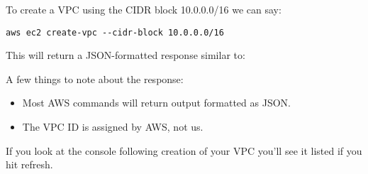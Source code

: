 To create a VPC using the CIDR block 10.0.0.0/16 we can say:

\begin{verbatim}
aws ec2 create-vpc --cidr-block 10.0.0.0/16
\end{verbatim}

This will return a JSON-formatted response similar to:

\begin{Shaded}
\begin{Highlighting}[]
\FunctionTok{\{}
    \FunctionTok{:} \FunctionTok{\{}
        \FunctionTok{:} \FunctionTok{,}
        \FunctionTok{:} \FunctionTok{,}
        \FunctionTok{:} \FunctionTok{,}
        \FunctionTok{:} \FunctionTok{,}
        \FunctionTok{:} \FunctionTok{,}
        \FunctionTok{:} \FunctionTok{,}
        \FunctionTok{:} \OtherTok{[]}\FunctionTok{,}
        \FunctionTok{:} \OtherTok{[}
            \FunctionTok{\{}
                \FunctionTok{:} \FunctionTok{,}
                \FunctionTok{:} \FunctionTok{,}
                \FunctionTok{:} \FunctionTok{\{}
                    \FunctionTok{:} 
                \FunctionTok{\}}
            \FunctionTok{\}}
        \OtherTok{]}\FunctionTok{,}
        \FunctionTok{:} 
    \FunctionTok{\}}
\FunctionTok{\}}
\end{Highlighting}
\end{Shaded}

A few things to note about the response:

\begin{itemize}
\item
  Most AWS commands will return output formatted as JSON.
\item
  The VPC ID is assigned by AWS, not us.
\end{itemize}

If you look at the console following creation of your VPC you'll see it
listed if you hit refresh.

